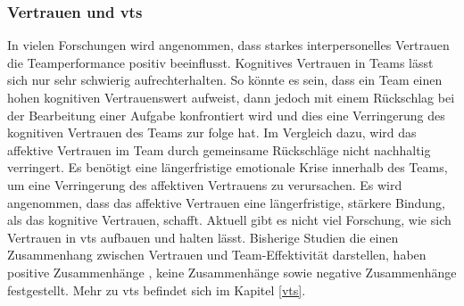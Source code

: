 \documentclass[a4paper,11pt]{article}%
\renewcommand{\\}{\vspace*{0.5\baselineskip} \newline}
\begin{document}

	\subsubsection{Vertrauen und \ac{vts}}
In vielen Forschungen wird angenommen, dass starkes interpersonelles Vertrauen die Teamperformance positiv beeinflusst. \citep{mcallister1995affect} \citep{mayer1995integrative} \citep{dirks2002trust}
Kognitives Vertrauen in Teams lässt sich nur sehr schwierig aufrechterhalten. So könnte es sein, dass ein Team einen hohen kognitiven Vertrauenswert aufweist, dann jedoch mit einem Rückschlag bei der Bearbeitung einer Aufgabe konfrontiert wird und dies eine Verringerung des kognitiven Vertrauen des Teams zur folge hat. \citep[p.29-31]{mcallister1995affect}
Im Vergleich dazu, wird das affektive Vertrauen im Team durch gemeinsame Rückschläge nicht nachhaltig verringert. Es benötigt eine längerfristige emotionale Krise innerhalb des Teams, um eine Verringerung des affektiven Vertrauens zu verursachen. Es wird angenommen, dass das affektive Vertrauen eine längerfristige, stärkere Bindung, als das kognitive Vertrauen, schafft.  \citep[p.29-31]{mcallister1995affect} \\
Aktuell gibt es nicht viel Forschung, wie sich Vertrauen in \ac{vts} aufbauen und halten lässt. \citep[p.8-23]{duarte2006mastering} 
Bisherige Studien die einen Zusammenhang zwischen Vertrauen und Team-Effektivität darstellen, haben positive Zusammenhänge \citep{davis2000trusted}, keine Zusammenhänge \citep{hertel2004managing} sowie negative Zusammenhänge \citep{dirks1999effects} festgestellt.
Mehr zu \ac{vts} befindet sich im Kapitel \ref{vts}.
\end{document}
